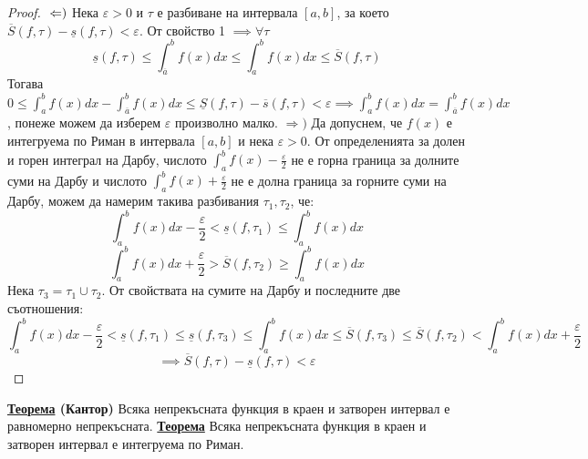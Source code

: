 \documentclass{article}
\begin{document}
\begin{proof}
    $\newline\Leftarrow)$ Нека $\varepsilon > 0$ и $\tau$ е разбиване на интервала $[a, b]$, за което $\overline{S}(f, \tau) - \underline{s}(f, \tau) < \varepsilon$.
    От свойство 1 $\implies \forall \tau$ $$\underline{s}(f, \tau) \leq \int_{\overline{a}}^{b} f(x)dx \leq \int_{a}^{b} f(x)dx \leq
    \overline{S}(f, \tau)$$ Тогава $0 \leq \int_{a}^{b} f(x)dx - \int_{\overline{a}}^{b} f(x)dx \leq \underline{S}(f, \tau) -
    \overline{s}(f, \tau) < \varepsilon \implies \int_{a}^{b} f(x)dx = \int_{\overline{a}}^{b} f(x)dx$, понеже можем да изберем
    $\varepsilon$ произволно малко. \newline\newline
    $\Rightarrow)$ Да допуснем, че $f(x)$ е интегруема по Риман в интервала $[a, b]$ и нека $\varepsilon > 0$. От определенията
    за долен и горен интеграл на Дарбу, числото $\int_{a}^{b} f(x) - \frac{\varepsilon}{2}$ не е горна граница за долните суми на
    Дарбу и числото $\int_{a}^{b} f(x) + \frac{\varepsilon}{2}$ не е долна граница за горните суми на Дарбу, можем да намерим
    такива разбивания $\tau_1, \tau_2$, че: $$\int_{a}^{b} f(x)dx - \frac{\varepsilon}{2} < \underline{s}(f, \tau_1) \leq
    \int_{a}^{b} f(x)dx$$ $$\int_{a}^{b} f(x)dx + \frac{\varepsilon}{2} > \overline{S}(f, \tau_2) \geq \int_{a}^{b} f(x)dx$$
    Нека $\tau_3 = \tau_1 \cup \tau_2$. От свойствата на сумите на Дарбу и последните две съотношения:
    $$\int_{a}^{b} f(x)dx - \frac{\varepsilon}{2} < \underline{s}(f, \tau_1) \leq \underline{s}(f, \tau_3) \leq \int_{a}^{b} f(x)dx
    \leq \overline{S}(f, \tau_3) \leq \overline{S}(f, \tau_2) < \int_{a}^{b} f(x)dx + \frac{\varepsilon}{2}$$
    $$\implies \overline{S} (f, \tau) - \underline{s}(f, \tau) < \varepsilon$$
\end{proof}
\textbf{\underline{Теорема} (Кантор)} \newline
Всяка непрекъсната функция в краен и затворен интервал е равномерно непрекъсната. \newline\newline
\textbf{\underline{Теорема}} \newline
Всяка непрекъсната функция в краен и затворен интервал е интегруема по Риман.
\end{document}
